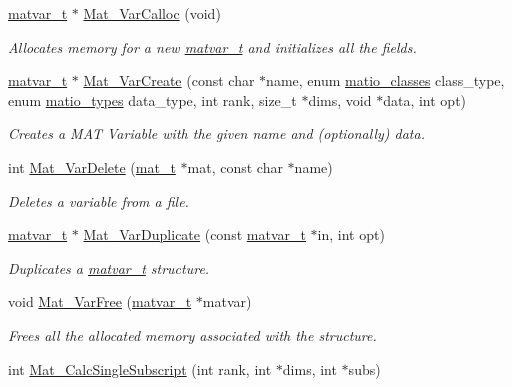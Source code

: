 \begin{DoxyCompactItemize}
\hyperlink{structmatvar__t}{matvar\-\_\-t} $\ast$ \hyperlink{group__MAT_gae7c9c3699f6e9c31a9c490300013098c}{\-Mat\-\_\-\-Var\-Calloc} (void)
\begin{DoxyCompactList}\small\item\em \-Allocates memory for a new \hyperlink{structmatvar__t}{matvar\-\_\-t} and initializes all the fields. \end{DoxyCompactList}\item 
\hyperlink{structmatvar__t}{matvar\-\_\-t} $\ast$ \hyperlink{group__MAT_ga1c54a84bb4d810c6fccdb8869489eac4}{\-Mat\-\_\-\-Var\-Create} (const char $\ast$name, enum \hyperlink{group__MAT_gad4d60ae7b709fc81bfd744fb4c857c40}{matio\-\_\-classes} class\-\_\-type, enum \hyperlink{group__MAT_gacf7b3b879282b7ab3a51190e49bf3453}{matio\-\_\-types} data\-\_\-type, int rank, size\-\_\-t $\ast$dims, void $\ast$data, int opt)
\begin{DoxyCompactList}\small\item\em \-Creates a \-M\-A\-T \-Variable with the given name and (optionally) data. \end{DoxyCompactList}\item 
int \hyperlink{group__MAT_gabf139e48d48177e5069338fa2919c60a}{\-Mat\-\_\-\-Var\-Delete} (\hyperlink{group__MAT_gab0fc888f5a5d79943b16284b1f91c2e8}{mat\-\_\-t} $\ast$mat, const char $\ast$name)
\begin{DoxyCompactList}\small\item\em \-Deletes a variable from a file. \end{DoxyCompactList}\item 
\hyperlink{structmatvar__t}{matvar\-\_\-t} $\ast$ \hyperlink{group__MAT_ga7ef80c5d99d7918b2b09db3bea106ecc}{\-Mat\-\_\-\-Var\-Duplicate} (const \hyperlink{structmatvar__t}{matvar\-\_\-t} $\ast$in, int opt)
\begin{DoxyCompactList}\small\item\em \-Duplicates a \hyperlink{structmatvar__t}{matvar\-\_\-t} structure. \end{DoxyCompactList}\item 
void \hyperlink{group__MAT_ga1d14716f7450530fd1c9d02413787f0e}{\-Mat\-\_\-\-Var\-Free} (\hyperlink{structmatvar__t}{matvar\-\_\-t} $\ast$matvar)
\begin{DoxyCompactList}\small\item\em \-Frees all the allocated memory associated with the structure. \end{DoxyCompactList}\item 
int \hyperlink{group__MAT_ga9b8d09f631538b14ca29792e0334e349}{\-Mat\-\_\-\-Calc\-Single\-Subscript} (int rank, int $\ast$dims, int $\ast$subs)

\end{DoxyCompactItemize}
